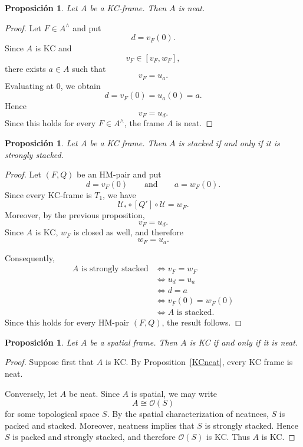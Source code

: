 \documentclass[11pt]{amsart}
\theoremstyle{plain}
\newtheorem{prop}[thm]{Proposición}
\theoremstyle{definition}
\begin{document}
\begin{prop}
Let $A$ be a KC-frame. Then $A$ is neat.
\end{prop}

\begin{proof}
Let $F\in A^\wedge$ and put
\[
d=v_F(0).
\]
Since $A$ is KC and
\[
v_F\in[v_F,w_F],
\]
there exists $a\in A$ such that
\[
v_F=u_a.
\]
Evaluating at $0$, we obtain
\[
d=v_F(0)=u_a(0)=a.
\]
Hence
\[
v_F=u_d.
\]
Since this holds for every $F\in A^\wedge$, the frame $A$ is
neat.
\end{proof}

\begin{prop}
Let $A$ be a KC frame. Then $A$ is stacked if and only if it is
strongly stacked.
\end{prop}

\begin{proof}
Let $(F,Q)$ be an HM-pair and put
\[
d=v_F(0)
\qquad\text{and}\qquad
a=w_F(0).
\]
Since every KC-frame is $T_1$, we have
\[
\mathcal{U}_*\circ[Q']\circ\mathcal{U}=w_F.
\]
Moreover, by the previous proposition,
\[
v_F=u_d.
\]
Since $A$ is KC, $w_F$ is closed as well, and therefore
\[
w_F=u_a.
\]

Consequently,
\[
\begin{aligned}
A\text{ is strongly stacked}
&\iff v_F=w_F\\
&\iff u_d=u_a\\
&\iff d=a\\
&\iff v_F(0)=w_F(0)\\
&\iff A\text{ is stacked}.
\end{aligned}
\]
Since this holds for every HM-pair $(F,Q)$, the result follows.
\end{proof}

\begin{prop}\label{KCiffNeat}
Let $A$ be a spatial frame. Then $A$ is KC if and only if it is
neat.
\end{prop}

\begin{proof}
Suppose first that $A$ is KC. By Proposition~\ref{KCneat}, every KC frame
is neat.

Conversely, let $A$ be neat. Since $A$ is spatial, we may write
\[
A\cong\mathcal{O}(S)
\]
for some topological space $S$. By the spatial characterization of
neatnees, $S$ is packed and stacked. Moreover, neatness implies
that $S$ is strongly stacked. Hence $S$ is packed and strongly
stacked, and therefore $\mathcal{O}(S)$ is KC. Thus $A$ is KC.
\end{proof}
\end{document}
